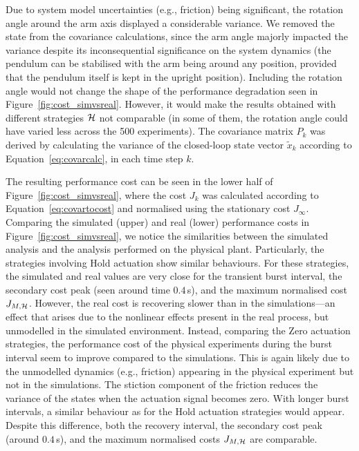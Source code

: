 Due to system model uncertainties (e.g., friction) being significant, the rotation angle around the arm axis displayed a considerable variance.
We removed the state from the covariance calculations, since the arm angle majorly impacted the variance despite its inconsequential significance on the system dynamics (the pendulum can be stabilised with the arm being around any position, provided that the pendulum itself is kept in the upright position).
Including the rotation angle would not change the shape of the performance degradation seen in Figure~\ref{fig:cost_simvsreal}. 
However, it would make the results obtained with different strategies $\mathcal{H}$ not comparable (in some of them, the rotation angle could have varied less across the 500 experiments). 
The covariance matrix $P_k$ was derived by calculating the variance of the closed-loop state vector $\tilde{x}_k$ according to Equation~\eqref{eq:covarcalc}, in each time step $k$. 

The resulting performance cost can be seen in the lower half of Figure~\ref{fig:cost_simvsreal}, where the cost $J_k$ was calculated according to Equation~\eqref{eq:covartocost} and normalised using the stationary cost $J_\infty$. 
Comparing the simulated (upper) and real (lower) performance costs in Figure~\ref{fig:cost_simvsreal}, we notice the similarities between the simulated analysis and the analysis performed on the physical plant. 
%
Particularly, the strategies involving Hold actuation show similar behaviours. 
For these strategies, the simulated and real values are very close for the transient burst interval, the secondary cost peak (seen around time $0.4\,$s), and the maximum normalised cost $J_{M, \mathcal{H}}$.
However, the real cost is recovering slower than in the simulations---an effect that arises due to the nonlinear effects present in the real process, but unmodelled in the simulated environment.
%
Instead, comparing the Zero actuation strategies, the performance cost of the physical experiments during the burst interval seem to improve compared to the simulations.
This is again likely due to the unmodelled dynamics (e.g., friction) appearing in the physical experiment but not in the simulations.
The stiction component of the friction reduces the variance of the states when the actuation signal becomes zero.
With longer burst intervals, a similar behaviour as for the Hold actuation strategies would appear.
Despite this difference, both the recovery interval, the secondary cost peak (around $0.4\,$s), and the maximum normalised costs $J_{M,\mathcal{H}}$ are comparable.

